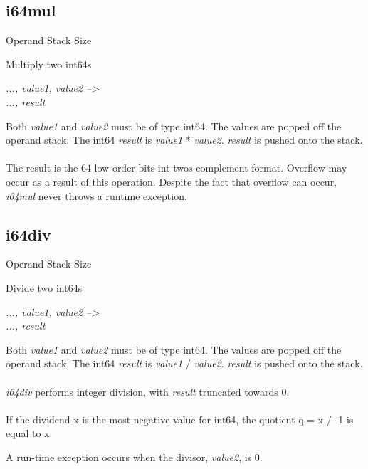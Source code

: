 \documentclass[12pt]{article}
\begin{document}
		\newpage
		\subsection*{i64mul}
			\begin{labeling}{Operand Stack Size}
				\item [\textbf{Operation}] Multiply two int64s
				\item [\textbf{Format}] 
				\item [\textbf{Operand Stack}] \textit{..., value1, value2 --\textgreater } \\
										\textit{..., result}
				\item [\textbf{Description}] Both \textit{value1} and \textit{value2} must be of type int64. The values are popped off the operand stack. The int64 \textit{result} is \textit{value1} * \textit{value2}. \textit{result} is pushed onto the stack. \\ \\
				The result is the 64 low-order bits int twos-complement format. 
				Overflow may occur as a result of this operation. Despite the fact that overflow can occur, \textit{i64mul} never throws a runtime exception. 			\end{labeling}		
				
		\newpage
		\subsection*{i64div}
			\begin{labeling}{Operand Stack Size}
				\item [\textbf{Operation}] Divide two int64s
				\item [\textbf{Format}] 
				\item [\textbf{Operand Stack}] \textit{..., value1, value2 --\textgreater } \\
										\textit{..., result}
				\item [\textbf{Description}] Both \textit{value1} and \textit{value2} must be of type int64. The values are popped off the operand stack. The int64 \textit{result} is \textit{value1} / \textit{value2}. \textit{result} is pushed onto the stack. \\ \\
				\textit{i64div} performs integer division, with \textit{result} truncated towards 0. \\ \\
				 If the dividend x is the most negative value for int64, the quotient q = x / -1 is equal to x.
				 \item [\textbf{Exception}] A run-time exception occurs when the divisor, \textit{value2}, is 0. 
			\end{labeling}		
			
\end{document}
